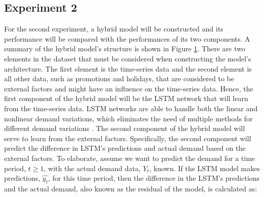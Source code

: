 \subsection*{Experiment 2}
\begin{figure}
    \vspace{-8.5mm}
    \label{fig:hyb_summary}
\end{figure}
For the second experiment, a hybrid model will be constructed and its performance will be compared with the performances of its two components.
A summary of the hybrid model's structure is shown in Figure \ref{fig:hyb_summary}.
There are two elements in the dataset that must be considered when constructing the model's architecture.
The first element is the time-series data and the second element is all other data, such as promotions and holidays, that are considered to be external factors and might have an influence on the time-series data.
Hence, the first component of the hybrid model will be the LSTM network that will learn from the time-series data. 
LSTM networks are able to handle both the linear and nonlinear demand variations, which eliminates the need of multiple methods for different demand variations \cite{c8}.
The second component of the hybrid model will serve to learn from the external factors. 
Specifically, the second component will predict the difference in LSTM's predictions and actual demand based on the external factors.
To elaborate, assume we want to predict the demand for a time period, \(t \geq 1\), with the actual demand data, \(Y_t\), known. 
If the LSTM model makes predictions, \(\hat{y_t}\), for this time period, then the difference in the LSTM's predictions and the actual demand, also known as the residual of the model, is calculated as:
